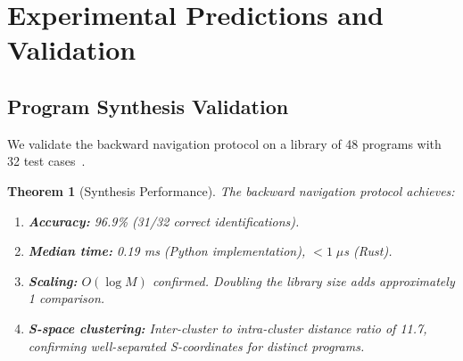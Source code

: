\documentclass[11pt,twocolumn,a4paper]{article}
\newtheorem{theorem}{Theorem}[section]
\theoremstyle{definition}
\begin{document}
\section{Experimental Predictions and Validation}\label{sec:experiments}

\subsection{Program Synthesis Validation}\label{sec:exp:synthesis}

We validate the backward navigation protocol on a library of 48 programs with 32 test
cases~\cite{sachikonye2025d}.

\begin{theorem}[Synthesis Performance]\label{thm:synthesis}
The backward navigation protocol achieves:
\begin{enumerate}[label=(\roman*)]
  \item \textbf{Accuracy:} 96.9\% (31/32 correct identifications).
  \item \textbf{Median time:} 0.19 ms (Python implementation), $< 1\;\mu$s (Rust).
  \item \textbf{Scaling:} $O(\log M)$ confirmed. Doubling the library size adds
        approximately 1 comparison.
  \item \textbf{S-space clustering:} Inter-cluster to intra-cluster distance ratio of 11.7,
        confirming well-separated S-coordinates for distinct programs.
\end{enumerate}
\end{theorem}
\end{document}
